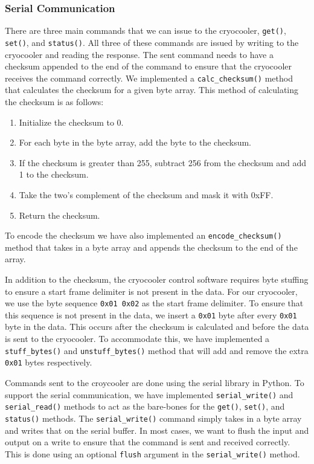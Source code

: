 \subsubsection{Serial Communication}
There are three main commands that we can issue to the cryocooler, \texttt{get()}, \texttt{set()}, and \texttt{status()}.
All three of these commands are issued by writing to the cryocooler and reading the response.
The sent command needs to have a checksum appended to the end of the command to ensure that the cryocooler receives the command correctly.
We implemented a \texttt{calc\_checksum()} method that calculates the checksum for a given byte array. 
This method of calculating the checksum is as follows:
\begin{enumerate}
    \item Initialize the checksum to 0.
    \item For each byte in the byte array, add the byte to the checksum.
    \item If the checksum is greater than 255, subtract 256 from the checksum and add 1 to the checksum.
    \item Take the two's complement of the checksum and mask it with 0xFF.
    \item Return the checksum.
\end{enumerate}
To encode the checksum we have also implemented an \texttt{encode\_checksum()} method that takes in a byte array and appends the checksum to the end of the array.

In addition to the checksum, the cryocooler control software requires byte stuffing to ensure a start frame delimiter is not present in the data.
For our cryocooler, we use the byte sequence \texttt{0x01 0x02} as the start frame delimiter.
To ensure that this sequence is not present in the data, we insert a \texttt{0x01} byte after every \texttt{0x01} byte in the data. 
This occurs after the checksum is calculated and before the data is sent to the cryocooler.
To accommodate this, we have implemented a \texttt{stuff\_bytes()} and \texttt{unstuff\_bytes()} method that will add and remove the extra \texttt{0x01} bytes respectively.

Commands sent to the croycooler are done using the serial library in Python.
To support the serial communication, we have implemented \texttt{serial\_write()} and \texttt{serial\_read()} methods to act as the bare-bones for the \texttt{get()}, \texttt{set()}, and \texttt{status()} methods.
The \texttt{serial\_write()} command simply takes in a byte array and writes that on the serial buffer.
In most cases, we want to flush the input and output on a write to ensure that the command is sent and received correctly.
This is done using an optional \texttt{flush} argument in the \texttt{serial\_write()} method.

